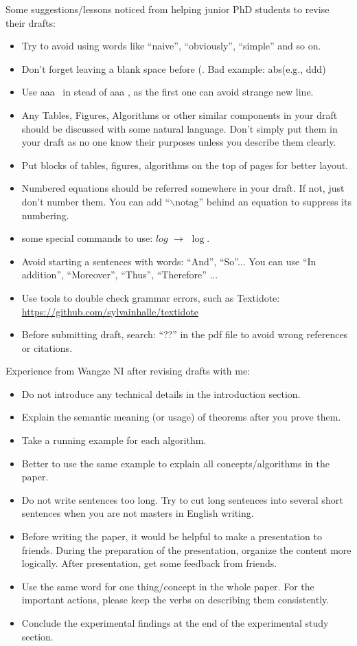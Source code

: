 Some suggestions/lessons noticed from helping junior PhD students to revise their drafts:
\begin{itemize}[leftmargin=*]
	\item Try to avoid using words like ``naive'', ``obviously'', ``simple'' and so on. 
	\item Don't forget leaving a blank space before (. Bad example: abs(e.g., ddd)
	\item Use aaa~\cite{cheng2016task} in stead of aaa \cite{cheng2016task}, as the first one can avoid strange
    \cite{cheng2016task} new line.
	\item Any Tables, Figures, Algorithms or other similar components in your draft should be discussed with some natural language. Don't simply put them in your draft as no one know their purposes unless you describe them clearly. 
	\item Put blocks of tables, figures, algorithms on the top of pages for better layout. 
	\item Numbered equations should be referred somewhere in your draft. If not, just don't number them. You can add ``$\backslash$notag'' behind an equation to suppress its numbering.
	\item some special commands to use: $log$ $\longrightarrow$ $\log$.
	\item Avoid starting a sentences with words: ``And'', ``So''... You can use ``In addition'', ``Moreover'', ``Thus'', ``Therefore'' ...
	\item Use tools to double check grammar errors, such as Textidote: \url{https://github.com/sylvainhalle/textidote}
	\item Before submitting draft, search: ``??'' in the pdf file to avoid wrong references or citations.
\end{itemize} 

Experience from Wangze NI after revising drafts with me:
\begin{itemize}
\item Do not introduce any technical details in the introduction section.
\item Explain the semantic meaning (or usage) of theorems after you prove them.
\item Take a running example for each algorithm.
\item Better to use the same example to explain all concepts/algorithms in the paper.
\item Do not write sentences too long. Try to cut long sentences into several short sentences when you are not masters in English writing.
\item Before writing the paper, it would be helpful to make a presentation to friends. During the preparation of the presentation, organize the content more logically. After presentation, get some feedback from friends.
\item Use the same word for one thing/concept in the whole paper. For the important actions, please keep the verbs on describing them consistently.
\item Conclude the experimental findings at the end of the experimental study section.
\end{itemize}
